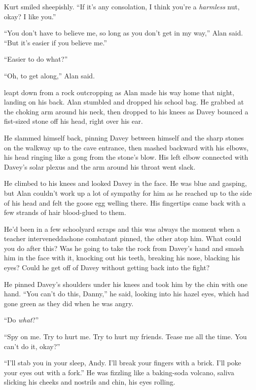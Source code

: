 Kurt smiled sheepishly.  ``If it's any consolation, I think you're a
\textit{harmless} nut, okay?  I like you.''

``You don't have to believe me, so long as you don't get in my way,''
Alan said.  ``But it's easier if you believe me.''

``Easier to do what?''

``Oh, to get along,'' Alan said.

 leapt down from a rock outcropping as Alan made his way home
that night, landing on his back.  Alan stumbled and dropped his school
bag.  He grabbed at the choking arm around his neck, then dropped to
his knees as Davey bounced a fist-sized stone off his head, right over
his ear.

He slammed himself back, pinning Davey between himself and the sharp
stones on the walkway up to the cave entrance, then mashed backward
with his elbows, his head ringing like a gong from the stone's blow. 
His left elbow connected with Davey's solar plexus and the arm around
his throat went slack.

He climbed to his knees and looked Davey in the face.  He was blue and
gasping, but Alan couldn't work up a lot of sympathy for him as he
reached up to the side of his head and felt the goose egg welling
there.  His fingertips came back with a few strands of hair
blood-glued to them.

He'd been in a few schoolyard scraps and this was always the moment
when a teacher interveneddash{}one combatant pinned, the other atop him. 
What could you do after this?  Was he going to take the rock from
Davey's hand and smash him in the face with it, knocking out his
teeth, breaking his nose, blacking his eyes?  Could he get off of
Davey without getting back into the fight?

He pinned Davey's shoulders under his knees and took him by the chin
with one hand.  ``You can't do this, Danny,'' he said, looking into
his hazel eyes, which had gone green as they did when he was angry.

``Do \textit{what}?''

``Spy on me.  Try to hurt me.  Try to hurt my friends.  Tease me all
the time.  You can't do it, okay?''

``I'll stab you in your sleep, Andy.  I'll break your fingers with a
brick.  I'll poke your eyes out with a fork.'' He was fizzling like a
baking-soda volcano, saliva slicking his cheeks and nostrils and chin,
his eyes rolling.

